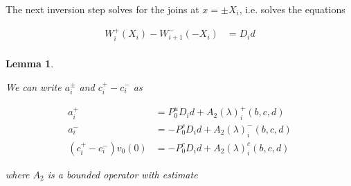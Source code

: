 \documentclass[12pt]{article}
\newtheorem{lemma}{Lemma}
\begin{document}
The next inversion step solves for the joins at $x = \pm X_i$, i.e. solves the equations

\begin{align*}
W_i^+(X_i) - W_{i+1}^-(-X_i) &= D_i d \\
\end{align*}


\begin{lemma}\label{inv2}







We can write $a_i^\pm$ and $c_i^+ - c_i^-$ as 

\begin{align*}
a_i^+ &= P^u_0 D_i d + A_2(\lambda)_i^+(b, c, d) \\
a_i^- &= -P^s_0 D_i d + A_2(\lambda)_i^-(b, c, d) \\
(c_i^+ - c_i^-)v_0(0) &= -P^c_0 D_i d + A_2(\lambda)_i^c(b, c, d)
\end{align*}

where $A_2$ is a bounded operator with estimate


\end{lemma}
\end{document}
